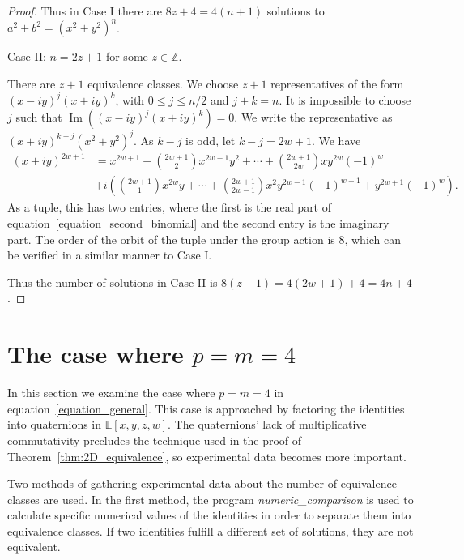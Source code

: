 \documentclass[12pt,table]{article}
\numberwithin{equation}{section}
\DeclareMathOperator{\Imag}{Im}
\newcommand{\myfrac}[2]{#1 / #2}
\newcommand{\Zzz}{\mathbb Z}
\newcommand{\Lll}{\mathbb L}
\begin{document}
\begin{landscape}
{{\begin{proof}
Thus in Case I there are $ 8z + 4 = 4 (n + 1 ) $ solutions
to $ a^2 + b^2 = (x^2 + y^2)^n $.



\noindent
Case II: $ n = 2z + 1$ for some $ z \in \Zzz $.

There are $ z + 1 $ equivalence classes. We choose $ z + 1 $
representatives of the form $ (x - iy)^j (x + iy)^k $, with
$ 0 \leq j \leq \myfrac{n}{2}$ and $ j + k = n $.
It is impossible to
choose $ j $ such that $ \Imag\left( (x - iy)^j (x + iy)^k \right) = 0$.
We write the representative as $ (x + iy)^{k-j} (x^2 + y^2)^j $.
As $ k - j $ is odd, let $ k - j = 2w + 1 $. We have
\begin{align}
\label{equation_second_binomial}
(x + iy) ^ {2w + 1} &= x ^ {2w + 1} - \binom{2w+1}{2}  x^{2w - 1 } y^2
+ \dotsb + \binom{2w+1}{2w} x y^{2w} (-1) ^ {w} \nonumber
\\
&+ i \left( \binom{2w+1}{1} x ^ {2w} y + \dotsb +
\binom{2w+1}{2w-1}  x^2 y ^ {2w -1} (-1)^{w-1}
+  y^{2w+1} (-1) ^ {w}
\right).
\end{align}
As a tuple, this has two entries, where the first is the real part
of equation~\eqref{equation_second_binomial} and the second entry
is the imaginary part.
The order of the orbit of the tuple under the group action is 8, which can be
verified in a similar manner to Case I.

Thus the number of solutions in Case II is $ 8(z + 1) = 4 ( 2w + 1) + 4 = 4n + 4 $.
\end{proof}




\section{The case where $p = m = 4$}
\label{sec:4D}

In this section we examine the case where
$p = m = 4$ in equation~\eqref{equation_general}.
This case is approached by factoring the identities
into quaternions in $\Lll[x,y,z,w]$. The quaternions'
lack of multiplicative commutativity precludes the 
technique used in the proof of Theorem~\ref{thm:2D_equivalence},
so experimental data becomes more important.


Two methods of gathering experimental data about the 
number of equivalence classes are used. 
In the first method,
the program \emph{numeric\_comparison}
is used to calculate specific numerical values of 
the identities in order to 
separate them into equivalence classes.
If two identities fulfill
a different set of solutions, they are
not equivalent.




}}
\end{landscape}
\end{document}
